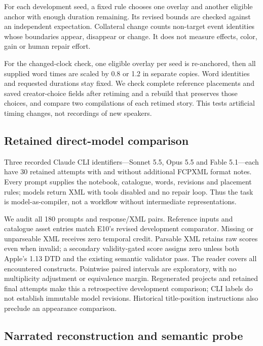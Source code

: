 \documentclass{ceurart}
\begin{document}
For each development seed, a fixed rule chooses one overlay and another
eligible anchor with enough duration remaining. Its revised bounds are
checked against an independent expectation. Collateral change counts
non-target event identities whose boundaries appear, disappear or
change. It does not measure effects, color, gain or human repair effort.

For the changed-clock check, one eligible overlay per seed is
re-anchored, then all supplied word times are scaled by 0.8 or 1.2 in
separate copies. Word identities and requested durations stay fixed. We
check complete reference placements and saved creator-choice fields
after retiming and a rebuild that preserves those choices, and compare
two compilations of each retimed story. This tests artificial timing
changes, not recordings of new speakers.

\subsection{Retained direct-model
comparison}\label{retained-direct-model-comparison}

Three recorded Claude CLI identifiers---Sonnet 5.5, Opus 5.5 and Fable
5.1---each have 30 retained attempts with and without additional FCPXML
format notes. Every prompt supplies the notebook, catalogue, words,
revisions and placement rules; models return XML with tools disabled and
no repair loop. Thus the task is model-as-compiler, not a workflow
without intermediate representations.

We audit all 180 prompts and response/XML pairs. Reference inputs and
catalogue asset entries match E10's revised development comparator.
Missing or unparseable XML receives zero temporal credit. Parsable XML
retains raw scores even when invalid; a secondary validity-gated score
assigns zero unless both Apple's 1.13 DTD and the existing semantic
validator pass. The reader covers all encountered constructs. Pointwise
paired intervals are exploratory, with no multiplicity adjustment or
equivalence margin. Regenerated projects and retained final attempts
make this a retrospective development comparison; CLI labels do not
establish immutable model revisions. Historical title-position
instructions also preclude an appearance comparison.

\subsection{Narrated reconstruction and semantic
probe}\label{narrated-reconstruction-and-semantic-probe}
\end{document}
